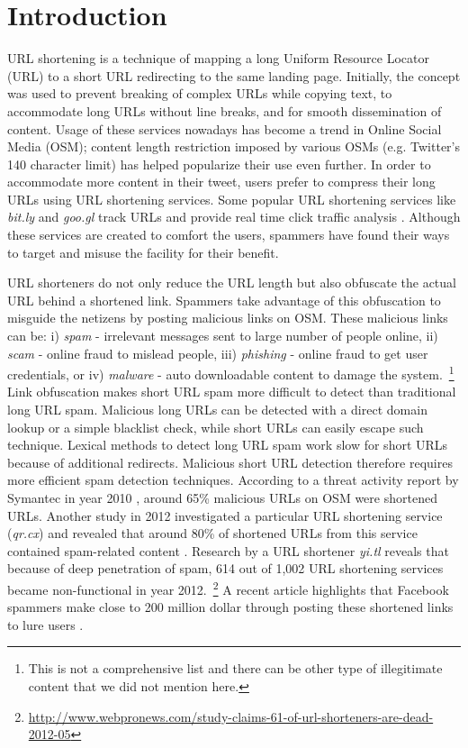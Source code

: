 \documentclass[conference]{IEEEtran}
\begin{document}
\IEEEpeerreviewmaketitle



\section{Introduction}
\vspace{4pt}
URL shortening is a technique of mapping a long Uniform Resource Locator (URL) to a short URL redirecting to the same landing page. Initially, the concept was used to prevent breaking of complex URLs while copying text, to accommodate long URLs without line breaks, and for smooth dissemination of content. Usage of these services nowadays has become a trend in Online Social Media (OSM); content length restriction imposed by various OSMs (e.g. Twitter's 140 character limit) has helped popularize their use even further. In order to accommodate more content in their tweet, users prefer to compress their long URLs using URL shortening services. Some popular URL shortening services like \textit{bit.ly} and \textit{goo.gl} track URLs and provide real time click traffic analysis \cite{25,29}. Although these services are created to comfort the users, spammers have found their ways to target and misuse the facility for their benefit.

URL shorteners do not only reduce the URL length but also obfuscate the actual URL behind a shortened link. Spammers take advantage of this obfuscation to misguide the netizens by posting malicious links on OSM. These malicious links can be: i) \textit{spam} - irrelevant messages sent to large number of people online, ii) \textit{scam} - online fraud to mislead people, iii) \textit{phishing} - online fraud to get user credentials, or iv) \textit{malware} - auto downloadable content to damage the system.~\footnote{This is not a comprehensive list and there can be other type of illegitimate content that we did not mention here.} Link obfuscation makes short URL spam more difficult to detect than traditional long URL spam. Malicious long URLs can be detected with a direct domain lookup or a simple blacklist check, while short URLs can easily escape such technique. Lexical methods to detect long URL spam work slow for short URLs because of additional redirects. Malicious short URL detection therefore requires more efficient spam detection techniques. According to a threat activity report by Symantec in year 2010 \cite{20}, around 65\% malicious URLs on OSM were shortened URLs. Another study in 2012 investigated a particular URL shortening service (\textit{qr.cx}) and revealed that around 80\% of shortened URLs from this service contained spam-related content \cite{2}. Research by a URL shortener \textit{yi.tl} reveals that because of deep penetration of spam, 614 out of 1,002 URL shortening services became non-functional in year 2012.~\footnote{\url{http://www.webpronews.com/study-claims-61-of-url-shorteners-are-dead-2012-05}} A recent article highlights that Facebook spammers make close to 200 million dollar through posting these shortened links to lure users \cite{21}.
\end{document}
